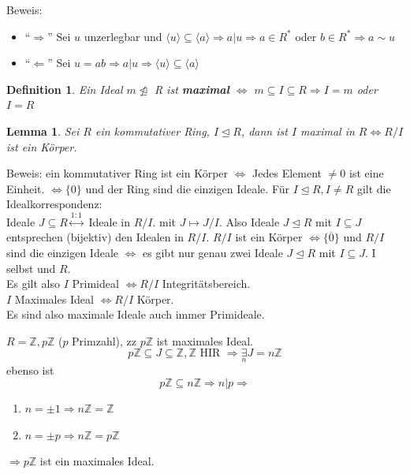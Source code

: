 \documentclass{article}
\newtheorem{defi}[thm]{Definition}
\newtheorem{lemma}[thm]{Lemma}
\newcommand{\Z}{\mathbb{Z}}
\begin{document}
Beweis:
\begin{itemize}
    \item ``$\Rightarrow$''
        Sei $u$ unzerlegbar und $\langle u\rangle\subseteq
        \langle a\rangle\Rightarrow a|u\Rightarrow a\in R^*$
        oder $b\in R^*\Rightarrow a\sim u$
    \item ``$\Leftarrow$''
        Sei $u=ab\Rightarrow a|u\Rightarrow\langle u\rangle
        \subseteq\langle a\rangle$
\end{itemize}
\begin{defi}
    Ein Ideal $m\ntrianglelefteq$ R ist \textbf{maximal}
    $\Leftrightarrow$ $m\subseteq I\subseteq R\Rightarrow I
    =m$ oder $I=R$
\end{defi}
\begin{lemma}
    Sei $R$ ein kommutativer Ring, $I\unlhd R$, dann ist
    $I$ maximal in $R\Leftrightarrow R/I$ ist ein Körper.
\end{lemma}
Beweis: ein kommutativer Ring ist ein Körper
$\Leftrightarrow$ Jedes Element $\neq 0$ ist eine Einheit.
$\Leftrightarrow\{0\}$ und der Ring sind die einzigen
Ideale. Für $I\unlhd R,I\neq R$ gilt die
Idealkorrespondenz:\\
Ideale $J\subseteq R\overset{1:1}\leftrightarrow$ Ideale in
$R/I$. mit $J\mapsto J/I$. Also Ideale $J\unlhd R$ mit
$I\subseteq J$ entsprechen (bijektiv) den Idealen in $R/I$.
$R/I$ ist ein Körper $\Leftrightarrow\{\overline{0}\}$ und
$R/I$ sind die einzigen Ideale $\Leftrightarrow$ es gibt
nur genau zwei Ideale $J\unlhd R$ mit $I\subseteq J$.
I selbst und $R$.\\
Es gilt also $I$ Primideal $\Leftrightarrow R/I$
Integritätsbereich.\\
$I$ Maximales Ideal $\Leftrightarrow R/I$ Körper.\\
Es sind also maximale Ideale auch immer Primideale.

\color{purple}
$R=\Z,p\Z$ ($p$ Primzahl), zz $p\Z$ ist maximales
Ideal.
\begin{equation*}
    p\Z\subseteq J\subseteq\Z,\Z\text{ HIR }
    \Rightarrow\underset{n}\exists J=n\Z
\end{equation*}
ebenso ist
\begin{equation*}
    p\Z\subseteq n\Z\Rightarrow n|p
    \Rightarrow
\end{equation*}
\begin{enumerate}[1.]
    \item
        $n=\pm 1\Rightarrow n\Z=\Z$
    \item
        $n=\pm p\Rightarrow n\Z=p\Z$
\end{enumerate}
$\Rightarrow p\Z$ ist ein maximales Ideal.
\end{document}
